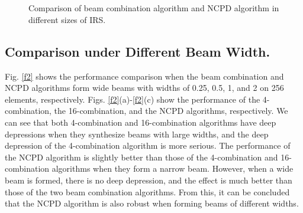 \documentclass[12pt,draftclsnofoot,onecolumn]{IEEEtran}
\begin{document}
	\begin{figure}
		\centering
		\\
		\\
		\caption{  Comparison of beam combination algorithm and NCPD algorithm in different sizes of IRS. }   \label{f1}
	\end{figure}
	
	\subsection{Comparison under Different Beam Width.}
	Fig. \ref{f2} shows the performance comparison when the beam combination  and NCPD algorithms form wide beams with widths of 0.25, 0.5, 1, and 2 on 256 elements, respectively. Figs. \ref{f2}(a)-\ref{f2}(c) show the performance of the 4-combination, the 16-combination, and the NCPD algorithms, respectively. We can see that both  4-combination and 16-combination algorithms have deep depressions when they synthesize  beams with large widths, and the deep depression of the 4-combination algorithm is more serious. The performance of the NCPD algorithm is slightly better than those of  the 4-combination and 16-combination algorithms when they form a narrow beam. However, when a wide beam is formed, there is no deep depression, and the effect is much better than those of  the two beam combination algorithms. From this, it can be concluded that the NCPD algorithm is also robust when forming beams of different widths.
	
\end{document}
